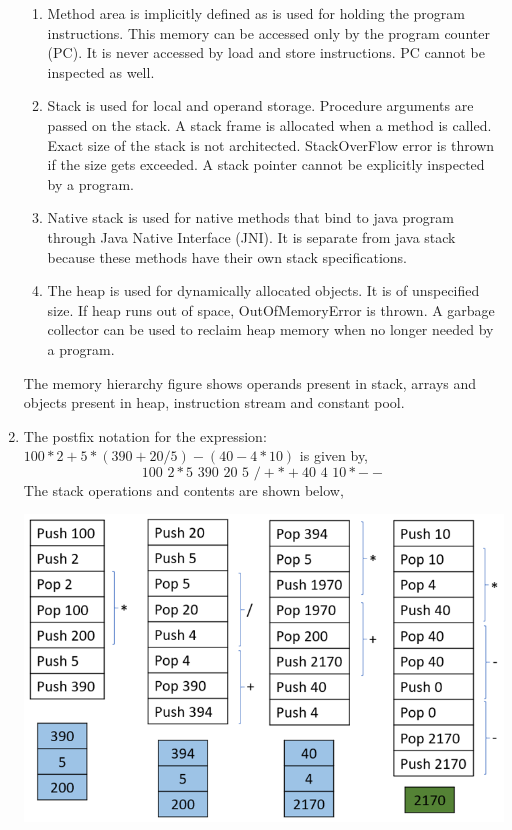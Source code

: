 \documentclass[11pt,a4paper,oneside]{article}
\begin{document}
\begin{enumerate}
\begin{verbatim}
	      \end{verbatim}
	      \begin{enumerate}
	      	\item Method area is implicitly defined as is used for holding the program instructions. This memory can be accessed only by the program counter (PC). It is never accessed by load and store instructions. PC cannot be inspected as well.
	      	\item Stack is used for local and operand storage. Procedure arguments are passed on the stack. A stack frame is allocated when a method is called. Exact size of the stack is not architected. StackOverFlow error is thrown if the size gets exceeded. A stack pointer cannot be explicitly inspected by a program. 
	      	\item Native stack is used for native methods that bind to java program through Java Native Interface (JNI). It is separate from java stack because these methods have their own stack specifications.
	      	\item The heap is used for dynamically allocated objects. It is of unspecified size. If heap runs out of space, OutOfMemoryError is thrown. A garbage collector can be used to reclaim heap memory when no longer needed by a program.
	      \end{enumerate}
      	  The memory hierarchy figure shows operands present in stack, arrays and objects present in heap, instruction stream and constant pool. 			
		
		\item The postfix notation for the expression: $100*2+5*(390+20/5)-(40-4*10)$ is given by, $$100\,\,2 * 5\,\,390\,\,20\,\,5\,\,/ + * + 40\,\,4\,\,10 * - -$$ The stack operations and contents are shown below, 
			  \begin{center}
			  \includegraphics[scale=0.6]{3.png}
			  \end{center}
		 

\end{enumerate}
\end{document}
